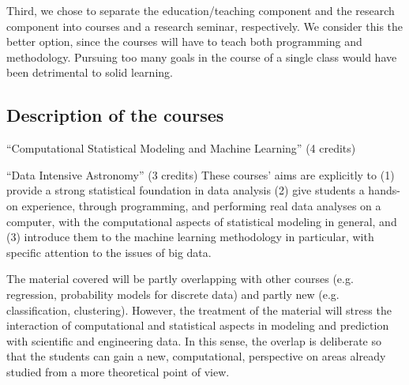 Third, we chose to separate the education/teaching component and the
research component into courses and a research seminar, respectively. We
consider this the better option, since the courses will have to teach
both programming and methodology. Pursuing too many goals in the
course of a single class would have been detrimental to solid learning.
 

\subsection{Description of the courses}
\label{sec:course-descr}

\bits
\item \statcl 
``Computational Statistical Modeling and Machine Learning'' (4 credits)
\item \astrocl ``Data Intensive Astronomy'' (3 credits)
\eits
These courses' aims are explicitly to (1) provide a strong statistical
foundation in data analysis (2) give students a hands-on experience, through programming, and performing real data analyses on a computer, with the computational aspects of 
statistical modeling in general, and (3)  introduce them to the  machine learning methodology in particular, with specific attention to the issues of big data.

The material covered will be partly overlapping with other courses
(e.g. regression, probability models for discrete data) and partly new
(e.g. classification, clustering). However, the treatment of the
material will stress the interaction of computational and
statistical aspects in modeling and prediction with scientific and
engineering data. In this sense, the overlap is deliberate
so that the students can gain a new, computational, perspective on areas
already studied from a more theoretical point of view. 

